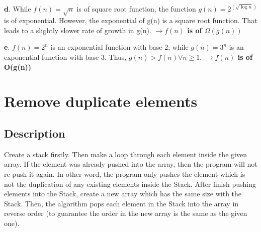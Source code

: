 \documentclass[16pt, letterpaper]{article}
\begin{document}
\textbf{d}. While $f(n) = \sqrt n$ is of square root function, the function $g(n) = 2^(\sqrt{\log n})$ is of exponential. However, the exponential of g(n) is a square root function. That leads to a slightly slower rate of growth in g(n). \textbf{$\longrightarrow f(n)$ is of $\Omega(g(n))$}

\textbf{e}. $f(n) = 2^n$ is an exponential function with base 2; while $g(n) = 3^n$ is an exponential function with base 3. Thus, $g(n) > f(n) \forall n \geq 1$. \textbf{$\longrightarrow f(n)$ is of O(g(n)) }

\section{Remove duplicate elements}
\subsection{Description}
Create a stack firstly. Then make a loop through each element inside the given array. If the element was already pushed into the array, then the program will not re-push it again. In other word, the program only pushes the element which is not the duplication of any existing elements inside the Stack. After finish pushing elements into the Stack, create a new array which has the same size with the Stack. Then, the algorithm pops each element in the Stack into the array in reverse order (to guarantee the order in the new array is the same as the given one).
\end{document}

